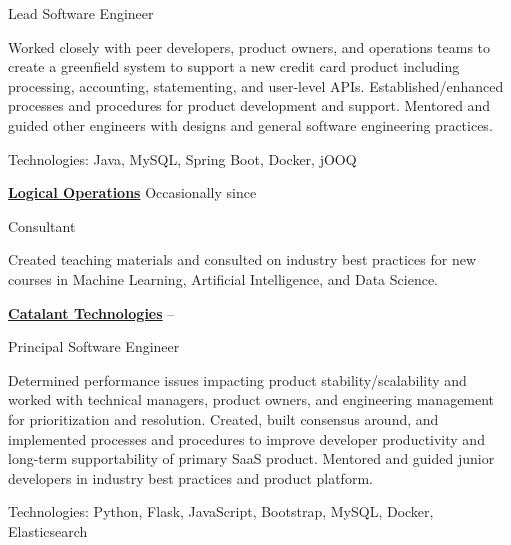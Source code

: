 \documentclass[letterpaper,MMMMyyyy,nonstopmode]{simpleresumecv}
\newif\ifLOCATION
\begin{document}
\begin{Body}
Lead Software Engineer
\ifLOCATION
\hfill
Rochester, New York
\fi

\begin{Detail}
\BulletItem
Worked closely with peer developers, product owners, and operations teams to create a greenfield system to support a new credit card product including processing, accounting, statementing, and user-level APIs.
\BulletItem
Established/enhanced processes and procedures for product development and support.
\BulletItem
Mentored and guided other engineers with designs and general software engineering practices.

\Gap
Technologies: Java, MySQL, Spring Boot, Docker, jOOQ

\end{Detail}

\BigGap

\Entry
\href{http://logicalopertions.com/}
{\textbf{Logical Operations}}
\hfill
Occasionally since 

Consultant
\ifLOCATION
\hfill 
Rochester, New York
\fi

\begin{Detail}
\BulletItem
Created teaching materials and consulted on industry best practices for new courses in Machine Learning, Artificial Intelligence, and Data Science.
\end{Detail}

\BigGap

\Entry
\href{http://www.gocatalant.com}
{\textbf{Catalant Technologies}}
\hfill
 -- 

Principal Software Engineer
\ifLOCATION
\hfill
Rochester, New York
\fi

\begin{Detail}
\BulletItem
Determined performance issues impacting product stability/scalability and worked with technical managers, product owners, and engineering management for prioritization and resolution.
\BulletItem
Created, built consensus around, and implemented processes and procedures to improve developer productivity and long-term supportability of primary SaaS product. 
\BulletItem
Mentored and guided junior developers in industry best practices and product platform.

\Gap
Technologies: Python, Flask, JavaScript, Bootstrap, MySQL, Docker, Elasticsearch

\end{Detail}


\end{Body}
\end{document}
